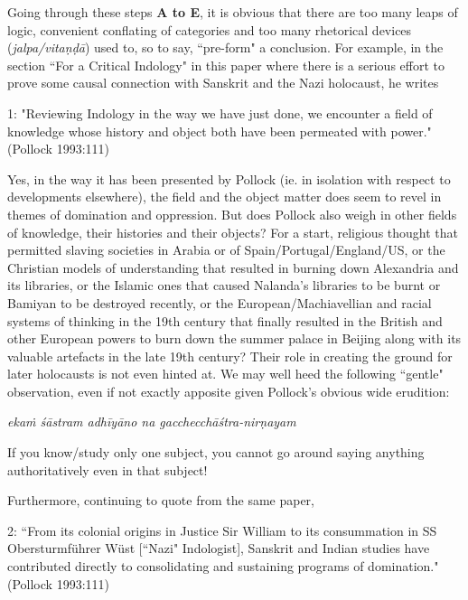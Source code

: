 {\begin{enumerate}
Going through these steps {\bf A to E}, it is obvious that there are too many leaps of logic, convenient conflating of categories and too many rhetorical devices ({\sl jalpa/vitaṇḍā}) used to, so to say, “pre-form" a conclusion. For example, in the section ``For a Critical Indology" in this paper where there is a serious effort to prove some causal connection with Sanskrit and the Nazi holocaust, he writes
\begin{myquote}
1: "Reviewing Indology in the way we have just done, we encounter a field of knowledge whose history and object 
both have been permeated with power."\hfill (Pollock 1993:111)
\end{myquote}

Yes, in the way it has been presented by Pollock (ie. in isolation with respect to developments elsewhere), the field and the object matter does seem to revel in themes of domination and oppression. But does Pollock also weigh in other fields of knowledge, their histories and their objects? For a start, religious thought that permitted slaving societies in Arabia or of Spain/Portugal/England/US, or the Christian models of understanding that resulted in burning down Alexandria and its libraries, or the Islamic ones that caused Nalanda's libraries to be burnt or Bamiyan to be destroyed recently, or the European/Machiavellian and racial systems of thinking in the 19th century that finally resulted in the British and other European powers to burn down the summer palace in Beijing along with its valuable artefacts in the late 19th century?  Their role in creating the ground for later holocausts is not even hinted at. We may well heed the following ``gentle" observation, even if not exactly apposite given Pollock’s obvious wide erudition:
\begin{myquote}
{\sl ekaṁ śāstram adhīyāno na gacchecchāśtra-nirṇayam}
\end{myquote}
If you know/study only one subject, you cannot go around saying anything authoritatively even in that subject!

Furthermore, continuing to quote from the same paper,
\begin{myquote}
2: ``From its colonial origins in Justice Sir William to its consummation in SS Obersturmführer Wüst [``Nazi" Indologist], Sanskrit and Indian studies have contributed directly to consolidating and sustaining programs of domination."	\hfill(Pollock 1993:111)
\end{myquote}


\end{enumerate}}
